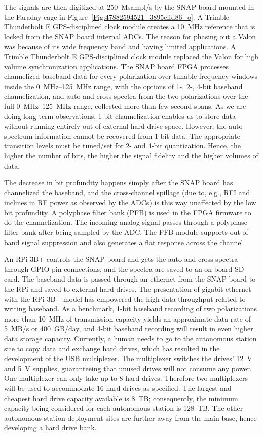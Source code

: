 The signals are then digitized at \SI{250}{Msampl/s} by the SNAP board mounted in the Faraday cage in Figure~\ref{Fig:47882594521_3895effd86_o}. A Trimble Thunderbolt E GPS-disciplined clock module creates a \SI{10}{\mega\hertz} reference that is locked from the SNAP board internal ADCs. The reason for phasing out a Valon was because of its wide frequency band and having limited applications. A Trimble Thunderbolt E GPS-disciplined clock module replaced the Valon for high volume synchronization applications. The SNAP board FPGA processes channelized baseband data for every polarization over tunable frequency windows inside the \SIrange{0}{125}{\mega\hertz} range, with the options of 1-, 2-, 4-bit baseband channelization, and auto-and cross-spectra from the two polarizations over the full \SIrange{0}{125}{\mega\hertz} range, collected more than few-second spans. As we are doing long term observations, 1-bit channelization enables us to store data without running entirely out of external hard drive space. However, the auto spectrum information cannot be recovered from 1-bit data. The appropriate transition levels must be tuned/set for 2- and 4-bit quantization. Hence, the higher the number of bits, the higher the signal fidelity and the higher volumes of data.

The decrease in bit profundity happens simply after the SNAP board has channelized the baseband, and the cross-channel spillage (due to, e.g., RFI and inclines in RF power as observed by the ADCs) is this way unaffected by the low bit profundity. A polyphase filter bank (PFB) is used in the FPGA firmware to do the channelization. The incoming analog signal passes through a polyphase filter bank after being sampled by the ADC. The PFB module supports out-of-band signal suppression and also generates a flat response across the channel.

An RPi 3B+ controls the SNAP board and gets the auto-and cross-spectra through GPIO pin connections, and the spectra are saved to an on-board SD card. The baseband data is passed through an ethernet from the SNAP board to the RPi and saved to external hard drives. The presentation of gigabit ethernet with the RPi 3B+ model has empowered the high data throughput related to writing baseband. As a benchmark, 1-bit baseband recording of two polarizations more than \SI{10}{\mega\hertz} of transmission capacity yields an approximate data rate of 5~MB/s or 400~GB/day, and 4-bit baseband recording will result in even higher data storage capacity. Currently, a human needs to go to the autonomous station site to copy data and exchange hard drives, which has resulted in the development of the USB multiplexer. The multiplexer switches the drives' \SI{12}{\volt} and \SI{5}{\volt} supplies, guaranteeing that unused drives will not consume any power. One multiplexer can only take up to 8 hard drives. Therefore two multiplexers will be used to accommodate 16 hard drives as specified. The largest and cheapest hard drive capacity available is 8~TB; consequently, the minimum capacity being considered for each autonomous station is 128~TB. The other autonomous station deployment sites are further away from the main base, hence developing a hard drive bank.

